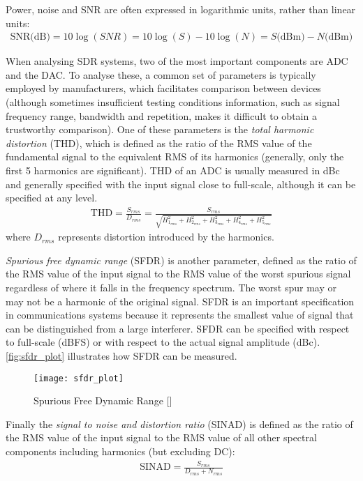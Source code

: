 \noindent Power, noise and SNR are often expressed in logarithmic units, rather than linear units:
\begin{align}
  \text{SNR(dB)} = 10\log(SNR) =  10\log(S) - 10\log(N) = S\text{(dBm)} - N\text{(dBm)}
\end{align}

When analysing SDR systems, two of the most important components are ADC and the DAC. To analyse these, a common set of parameters is typically employed by manufacturers, which facilitates comparison between devices (although sometimes insufficient testing conditions information, such as signal frequency range, bandwidth and repetition, makes it difficult to obtain a trustworthy comparison). One of these parameters is the \emph{total harmonic distortion} (THD), which is defined as the ratio of the RMS value of the fundamental signal to the equivalent RMS of its harmonics (generally, only the first 5 harmonics are significant). THD of an ADC is usually measured in dBc and generally specified with the input signal close to full-scale, although it can be specified at any level.
\begin{align}
  \text{THD} = \frac{S_{rms}}{D_{rms}} = \frac{S_{rms}}{\sqrt{H_{1_{rms}}^2+H_{2_{rms}}^2+H_{3_{rms}}^2+H_{4_{rms}}^2+H_{5_{rms}}^2}}
\end{align}
where $D_{rms}$ represents distortion introduced by the harmonics.

\emph{Spurious free dynamic range} (SFDR) is another parameter, defined as the ratio of the RMS value of the input signal to the RMS value of the worst spurious signal regardless of where it falls in the frequency spectrum. The worst spur may or may not be a harmonic of the original signal. SFDR is an important specification in communications systems because it represents the smallest value of signal that can be distinguished from a large interferer. SFDR can be specified with respect to full-scale (dBFS) or with respect to the actual signal amplitude (dBc). \autoref{fig:sfdr_plot} illustrates how SFDR can be measured.

\begin{figure}[ht]
  \centering
  \texttt{[image: sfdr\_plot]}
  \caption{Spurious Free Dynamic Range [\citeauthor{understand_sinad}]}
  \label{fig:sfdr_plot}
\end{figure}

Finally the \emph{signal to noise and distortion ratio} (SINAD) is defined as the ratio of the RMS value of the input signal to the RMS value of all other spectral components including harmonics (but excluding DC):
\begin{align}
  \text{SINAD} = \frac{S_{rms}}{D_{rms}+N_{rms}}
\end{align}

